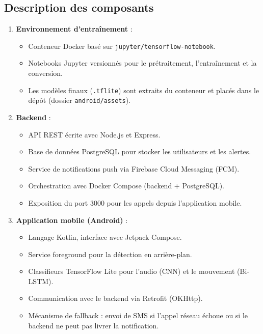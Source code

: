 \documentclass[11pt,a4paper]{article}
\begin{document}
\newpage

\subsection{Description des composants}
\begin{enumerate}
    \item \textbf{Environnement d’entraînement} :
        \begin{itemize}
            \item Conteneur Docker basé sur \texttt{jupyter/tensorflow-notebook}.
            \item Notebooks Jupyter versionnés pour le prétraitement, l’entraînement et la conversion.
            \item Les modèles finaux (\texttt{.tflite}) sont extraits du conteneur et placés dans le dépôt (dossier \texttt{android/assets}).
        \end{itemize}
    \item \textbf{Backend} :
        \begin{itemize}
            \item API REST écrite avec Node.js et Express.
            \item Base de données PostgreSQL pour stocker les utilisateurs et les alertes.
            \item Service de notifications push via Firebase Cloud Messaging (FCM).
            \item Orchestration avec Docker Compose (backend + PostgreSQL).
            \item Exposition du port 3000 pour les appels depuis l’application mobile.
        \end{itemize}
    \item \textbf{Application mobile (Android)} :
        \begin{itemize}
            \item Langage Kotlin, interface avec Jetpack Compose.
            \item Service foreground pour la détection en arrière-plan.
            \item Classifieurs TensorFlow Lite pour l’audio (CNN) et le mouvement (Bi-LSTM).
            \item Communication avec le backend via Retrofit (OKHttp).
            \item Mécanisme de fallback : envoi de SMS si l’appel réseau échoue ou si le backend ne peut pas livrer la notification.
        \end{itemize}
\end{enumerate}
\end{document}
